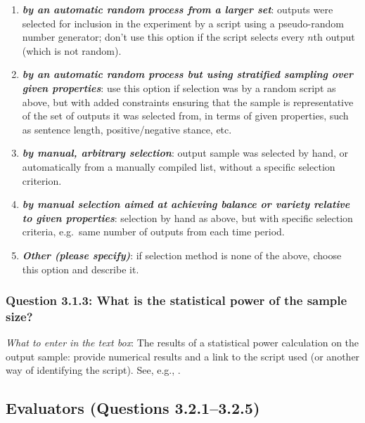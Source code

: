 \documentclass[11pt,a4paper]{article}
\newcommand{\egcvalue}[1]{\textbf{\textit{#1}}}
\begin{document}
\begin{enumerate}[itemsep=0cm,leftmargin=0.5cm,label={\LARGE $\circ$}]
    \item \egcvalue{by an automatic random process from a larger set}: outputs were selected for inclusion in the experiment by a script using a pseudo-random number generator; don't use this option if the script selects every $n$th output (which is not random). 
    \item \egcvalue{by an automatic random process but using stratified sampling over given properties}: use this option if selection was by a random script as above, but with added constraints ensuring that the sample is representative of the set of outputs it was selected from, in terms of given properties, such as sentence length, positive/negative stance, etc.
    \item \egcvalue{by manual, arbitrary selection}: output sample was selected by hand, or automatically from a manually compiled list, without a specific selection criterion.
    \item \egcvalue{by manual selection aimed at achieving balance or variety relative to given properties}: selection by hand as above, but with specific selection criteria, e.g.\ same number of outputs from each time period.
    \item \egcvalue{Other (please specify)}: if selection method is none of the above, choose this option and describe it.
\end{enumerate}

\vspace{-.3cm}
\subsubsection*{Question 3.1.3: What is the statistical power of the sample size?}

\noindent\textit{What to enter in the text box}:  The results of a statistical power calculation on the output sample: provide numerical results and a link to the script used (or another way of identifying the script). See, e.g., \citet{card-etal-2020-little, howcroft-rieser-2021-happens}.



\subsection{Evaluators (Questions 3.2.1--3.2.5)}
\end{document}
